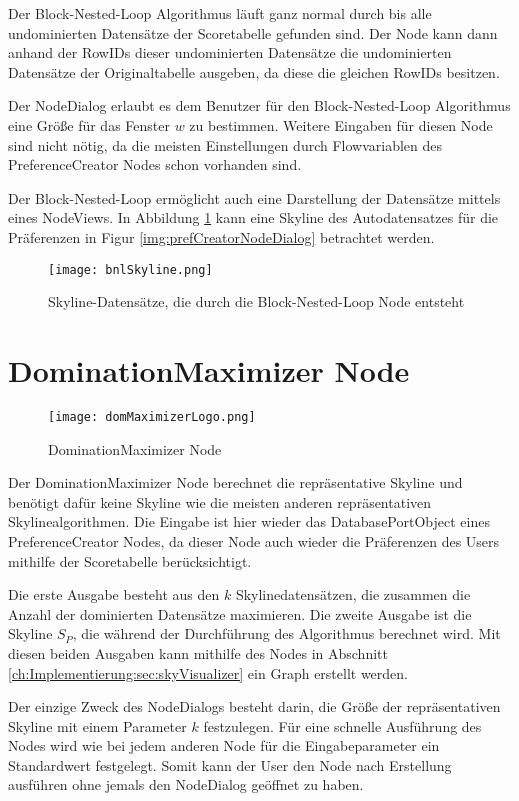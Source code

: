 Der Block-Nested-Loop Algorithmus läuft ganz normal durch bis alle undominierten Datensätze der Scoretabelle gefunden sind. Der Node kann dann anhand der RowIDs dieser undominierten Datensätze die undominierten Datensätze der Originaltabelle ausgeben, da diese die gleichen RowIDs besitzen.

Der NodeDialog erlaubt es dem Benutzer für den Block-Nested-Loop Algorithmus eine Größe für das Fenster $w$ zu bestimmen. Weitere Eingaben für diesen Node sind nicht nötig, da die meisten Einstellungen durch Flowvariablen des PreferenceCreator Nodes schon vorhanden sind.

Der Block-Nested-Loop ermöglicht auch eine Darstellung der Datensätze mittels eines NodeViews. In Abbildung \ref{img:bnlSkyline} kann eine Skyline des Autodatensatzes für die Präferenzen in Figur \ref{img:prefCreatorNodeDialog} betrachtet werden.

\begin{figure}[H]
	\centering
	\texttt{[image: bnlSkyline.png]}
	\caption{Skyline-Datensätze, die durch die Block-Nested-Loop Node entsteht}
	\label{img:bnlSkyline}
\end{figure}
\section{DominationMaximizer Node}
\label{ch:Implementierung:sec:dominationMaximizerNode}
\begin{figure}[H]
	\centering
	\texttt{[image: domMaximizerLogo.png]}
	\caption{DominationMaximizer Node}
	\label{img:domMaximierLogo}
\end{figure}

Der DominationMaximizer Node berechnet die repräsentative Skyline und benötigt dafür keine Skyline wie die meisten anderen repräsentativen Skylinealgorithmen. Die Eingabe ist hier wieder das DatabasePortObject eines PreferenceCreator Nodes, da dieser Node auch wieder die Präferenzen des Users mithilfe der Scoretabelle berücksichtigt. 

Die erste Ausgabe besteht aus den $k$ Skylinedatensätzen, die zusammen die Anzahl der dominierten Datensätze maximieren. Die zweite Ausgabe ist die Skyline $S_P$, die während der Durchführung des Algorithmus berechnet wird. Mit diesen beiden Ausgaben kann mithilfe des Nodes in Abschnitt \ref{ch:Implementierung:sec:skyVisualizer} ein Graph erstellt werden. 

Der einzige Zweck des NodeDialogs besteht darin, die Größe der repräsentativen Skyline mit einem Parameter $k$ festzulegen. Für eine schnelle Ausführung des Nodes wird wie bei jedem anderen Node für die Eingabeparameter ein Standardwert festgelegt. Somit kann der User den Node nach Erstellung ausführen ohne jemals den NodeDialog geöffnet zu haben.  

